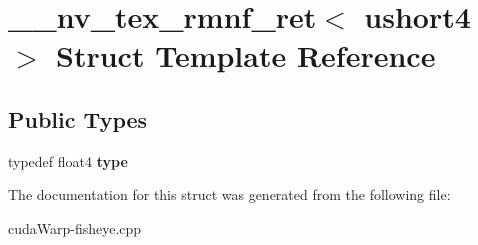 \hypertarget{struct____nv__tex__rmnf__ret_3_01ushort4_01_4}{}\section{\+\_\+\+\_\+nv\+\_\+tex\+\_\+rmnf\+\_\+ret$<$ ushort4 $>$ Struct Template Reference}
\label{struct____nv__tex__rmnf__ret_3_01ushort4_01_4}
\subsection*{Public Types}
\begin{DoxyCompactItemize}
\item 
typedef float4 {\bfseries type}\hypertarget{struct____nv__tex__rmnf__ret_3_01ushort4_01_4_af49b8c9d65ec027faf73282b08143e37}{}\label{struct____nv__tex__rmnf__ret_3_01ushort4_01_4_af49b8c9d65ec027faf73282b08143e37}

\end{DoxyCompactItemize}


The documentation for this struct was generated from the following file\+:\begin{DoxyCompactItemize}
\item 
cuda\+Warp-\/fisheye.\+cpp\end{DoxyCompactItemize}
